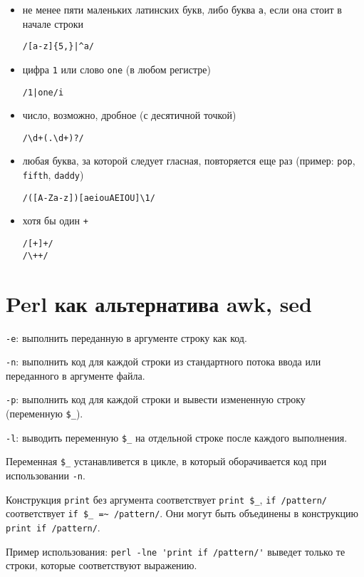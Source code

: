 \documentclass[listings]{labreport}
\begin{document}
\begin{itemize}
\item не менее пяти маленьких латинских букв, либо буква \texttt{a}, если она стоит в начале строки

\begin{verbatim}
/[a-z]{5,}|^a/
\end{verbatim}

\item цифра \texttt{1} или слово \texttt{one} (в любом регистре)

\begin{verbatim}
/1|one/i
\end{verbatim}

\item число, возможно, дробное (с десятичной точкой)

\begin{verbatim}
/\d+(.\d+)?/
\end{verbatim}

\item любая буква, за которой следует гласная, повторяется еще раз (пример: \texttt{pop}, \texttt{fifth}, \texttt{daddy})

\begin{verbatim}
/([A-Za-z])[aeiouAEIOU]\1/
\end{verbatim}

\item хотя бы один \texttt{+}

\begin{verbatim}
/[+]+/
/\++/
\end{verbatim}

\end{itemize}

\section*{Perl как альтернатива awk, sed}

\verb|-e|: выполнить переданную в аргументе строку как код.

\verb|-n|: выполнить код для каждой строки из стандартного потока ввода или переданного в аргументе файла.

\verb|-p|: выполнить код для каждой строки и вывести измененную строку (переменную \verb|$_|).

\verb|-l|: выводить переменную \verb|$_| на отдельной строке после каждого выполнения.

Переменная \verb|$_| устанавливется в цикле, в который оборачивается код при использовании \verb|-n|.

Конструкция \texttt{print} без аргумента соответствует \verb|print $_|, \texttt{if /pattern/} соответствует
\verb|if $_ =~ /pattern/|. Они могут быть объединены в конструкцию \verb|print if /pattern/|.

Пример использования: \verb|perl -lne 'print if /pattern/'|
выведет только те строки, которые соответствуют выражению.
\end{document}
